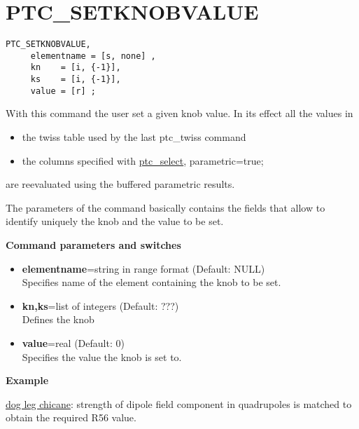 
\section{PTC\_SETKNOBVALUE}

\begin{verbatim}
PTC_SETKNOBVALUE, 
     elementname = [s, none] , 
     kn    = [i, {-1}], 
     ks    = [i, {-1}], 
     value = [r] ; 
\end{verbatim}

With this command the user set a given knob value. In its effect all the values in 
\begin{itemize}
   \item  the twiss table used by the last ptc\_twiss command 
   \item  the columns specified with
     \href{PTC_Select.html}{ptc\_select}, parametric=true; 
\end{itemize} 
are reevaluated using the buffered parametric results.  

The parameters of the command basically contains the fields that allow
to identify uniquely the knob and the value to be set.

{\bf Command parameters and switches}
\begin{itemize}
   \item {\bf elementname}=string in range format (Default: NULL)\\
     Specifies name of the element containing the knob to be set.   

   \item {\bf kn,ks}=list of integers (Default: ???)\\
     Defines the knob   

   \item {\bf value}=real (Default: 0)\\
     Specifies the value the knob is set to.             
\end{itemize}

{\bf Example }

\href{http://cern.ch/frs/mad-X_examples/ptc_madx_interface/matchknobs/matchknobs.madx}{dog
  leg chicane}: strength of dipole field component in quadrupoles is
matched to obtain the required R56 value.    


% 


